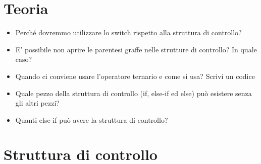 \documentclass{article}
\begin{document}
\section{Teoria}

\begin{itemize}

    \item Perché dovremmo utilizzare lo switch rispetto alla struttura di controllo?
    \item E' possibile non aprire le parentesi graffe nelle strutture di controllo? In quale caso?
    \item Quando ci conviene usare l'operatore ternario e come si usa? Scrivi un codice
    \item Quale pezzo della struttura di controllo (if, else-if ed else) può esistere senza gli altri pezzi? 
    \item Quanti else-if può avere la struttura di controllo?

\end{itemize}

\section{Struttura di controllo}
\end{document}
